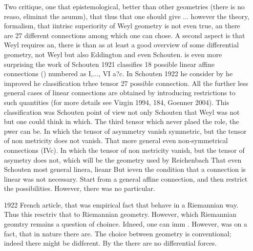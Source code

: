 \documentclass[draft]{article}
\begin{document}
Two critique, one that epistemological, better than other geometries (there is no reaso, eliminat the asumm), that thus that one should give ... however the theory, formalism, that iintrisc superiority of Weyl geometry is not even true, an there are 27 different connections among which one can chose.  A second aspect is that Weyl requires an, there is than as at least a good overview of some differential geometry, not Weyl but also Eddington and even Schouten. is even more surprising the work of Schouten 1921 classifies 18 possible linear affine connections () numbered as I,..., VI a?c. In Schouten 1922 he consider by he improved he classification trhee tensor 27 possible connection. All the further less general cases of linear connections are obtained by introducing restrictions to such quantities (for more details see Vizgin 1994, 184, Goenner 2004). This classification was Schouten point of view not only Schouten that Weyl was not but one could think in which. The third tensor which never plaed the role, the pwer can be. In which the tensor of asymmetry vanish symmetric, but the tensor of non metricity does not vanish. That more general even non-symmetrical connections (IVc). In which the tensor of non metricity vanish, but the tensor of asymetry does not, which will be the geometry used by Reichenbach  That even Schouten most general linera, lieanr But ieven the condition that a connection is linear was not necessary. Start from a general affine connection, and then restrict the possibilities. However, there was no particular. 

1922 French article, that was empirical fact that \rac behave in a Riemannian way. Thus this resctriv that to Riemannian geometry. However, which Riemannian geomtry remains a question of choince. Idneed, one can imm  . However, was on a fact, that in nature there are. The choice between geometry is conventional; indeed there might be didferent. By the there are no differential forces. 











\end{document}
